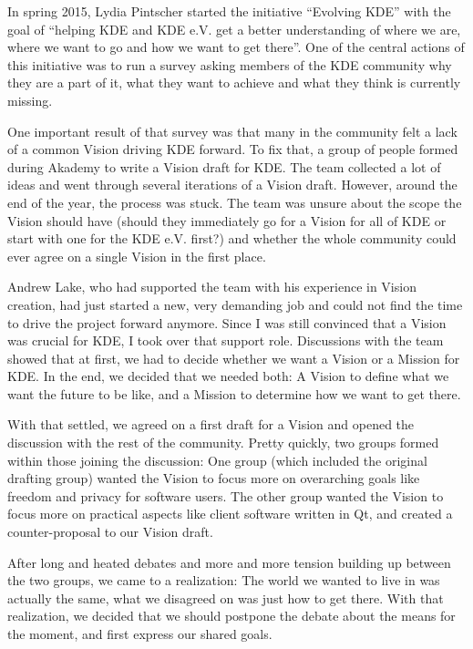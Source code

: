 

\noindent{}In spring 2015, Lydia Pintscher started the initiative ``Evolving KDE'' with the goal of ``helping KDE and KDE e.V. get a better understanding of where we are, where we want to go and how we want to get there''. One of the central actions of this initiative was to run a survey asking members of the KDE community why they are a part of it, what they want to achieve and what they think is currently missing.

One important result of that survey was that many in the community felt a lack of a common Vision driving KDE forward. To fix that, a group of people formed during Akademy to write a Vision draft for KDE. The team collected a lot of ideas and went through several iterations of a Vision draft. However, around the end of the year, the process was stuck. The team was unsure about the scope the Vision should have (should they immediately go for a Vision for all of KDE or start with one for the KDE e.V. first?) and whether the whole community could ever agree on a single Vision in the first place.

Andrew Lake, who had supported the team with his experience in Vision creation, had just started a new, very demanding job and could not find the time to drive the project forward anymore. Since I was still convinced that a Vision was crucial for KDE, I took over that support role. Discussions with the team showed that at first, we had to decide whether we want a Vision or a Mission for KDE. In the end, we decided that we needed both: A Vision to define what we want the future to be like, and a Mission to determine how we want to get there.

With that settled, we agreed on a first draft for a Vision and opened the discussion with the rest of the community. Pretty quickly, two groups formed within those joining the discussion: One group (which included the original drafting group) wanted the Vision to focus more on overarching goals like freedom and privacy for software users. The other group wanted the Vision to focus more on practical aspects like client software written in Qt, and created a counter-proposal to our Vision draft.

After long and heated debates and more and more tension building up between the two groups, we came to a realization: The world we wanted to live in was actually the same, what we disagreed on was just how to get there. With that realization, we decided that we should postpone the debate about the means for the moment, and first express our shared goals.

